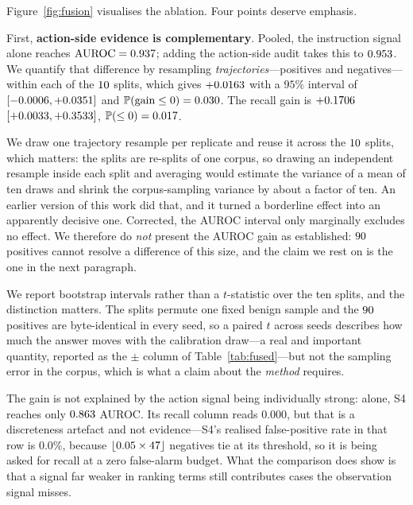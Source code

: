 \documentclass[preprint,12pt,authoryear]{elsarticle}
\theoremstyle{definition}
\newcommand{\Prob}{\mathbb{P}}
\begin{document}
Figure~\ref{fig:fusion} visualises the ablation. Four points deserve emphasis.

First, \textbf{action-side evidence is complementary}. Pooled, the instruction
signal alone reaches $\mathrm{AUROC} = 0.937$; adding the action-side
audit takes this to $0.953$. We quantify that difference by resampling
\emph{trajectories}---positives and negatives---within each of the $10$
splits, which gives $+0.0163$ with a $95\%$ interval of
$[-0.0006, +0.0351]$ and $\Prob(\text{gain} \le 0) =
\BootGainAurocP$. The recall gain is $+0.1706$
$[+0.0033, +0.3533]$, $\Prob(\le 0) = \BootGainTprP$.

We draw one trajectory resample per replicate and reuse it across the $10$
splits, which matters: the splits are re-splits of one corpus, so drawing an
independent resample inside each split and averaging would estimate the variance of
a mean of ten draws and shrink the corpus-sampling variance by about a factor of
ten. An earlier version of this work did that, and it turned a borderline effect
into an apparently decisive one. Corrected, the AUROC interval only marginally
excludes no effect. We therefore do \emph{not} present the AUROC gain as
established: $90$ positives cannot resolve a difference of this size, and the
claim we rest on is the one in the next paragraph.

We report bootstrap intervals rather than a $t$-statistic over the ten splits, and
the distinction matters. The splits permute one fixed benign sample and the
$90$ positives are byte-identical in every seed, so a paired $t$ across seeds
describes how much the answer moves with the calibration draw---a real and
important quantity, reported as the $\pm$ column of Table~\ref{tab:fused}---but not
the sampling error in the corpus, which is what a claim about the \emph{method}
requires.

The gain is not explained by the action signal being individually strong: alone, S4
reaches only $0.863$ AUROC. Its recall column reads $0.000$, but that is a
discreteness artefact and not evidence---S4's realised false-positive rate in that
row is $0.0\%$, because $\lfloor 0.05 \times 47 \rfloor$ negatives tie at its
threshold, so it is being asked for recall at a zero false-alarm budget. What the
comparison does show is that a signal far weaker in ranking terms still contributes
cases the observation signal misses.
\end{document}
